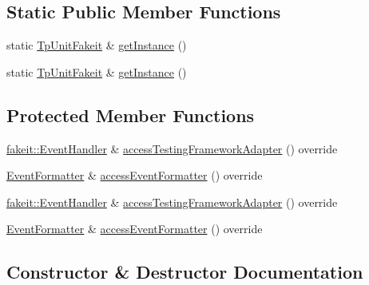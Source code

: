 \subsection*{Static Public Member Functions}
\begin{DoxyCompactItemize}
\item 
static \mbox{\hyperlink{classfakeit_1_1TpUnitFakeit}{Tp\+Unit\+Fakeit}} \& \mbox{\hyperlink{classfakeit_1_1TpUnitFakeit_ae92881b2c1b37f04ed19bc3a95e4514f}{get\+Instance}} ()
\item 
static \mbox{\hyperlink{classfakeit_1_1TpUnitFakeit}{Tp\+Unit\+Fakeit}} \& \mbox{\hyperlink{classfakeit_1_1TpUnitFakeit_ae92881b2c1b37f04ed19bc3a95e4514f}{get\+Instance}} ()
\end{DoxyCompactItemize}
\subsection*{Protected Member Functions}
\begin{DoxyCompactItemize}
\item 
\mbox{\hyperlink{structfakeit_1_1EventHandler}{fakeit\+::\+Event\+Handler}} \& \mbox{\hyperlink{classfakeit_1_1TpUnitFakeit_a38a83890a6d647457022347cd2a42aaf}{access\+Testing\+Framework\+Adapter}} () override
\item 
\mbox{\hyperlink{structfakeit_1_1EventFormatter}{Event\+Formatter}} \& \mbox{\hyperlink{classfakeit_1_1TpUnitFakeit_ae0f3713842b30e36ee1b0ce03a070b59}{access\+Event\+Formatter}} () override
\item 
\mbox{\hyperlink{structfakeit_1_1EventHandler}{fakeit\+::\+Event\+Handler}} \& \mbox{\hyperlink{classfakeit_1_1TpUnitFakeit_a38a83890a6d647457022347cd2a42aaf}{access\+Testing\+Framework\+Adapter}} () override
\item 
\mbox{\hyperlink{structfakeit_1_1EventFormatter}{Event\+Formatter}} \& \mbox{\hyperlink{classfakeit_1_1TpUnitFakeit_ae0f3713842b30e36ee1b0ce03a070b59}{access\+Event\+Formatter}} () override
\end{DoxyCompactItemize}


\subsection{Constructor \& Destructor Documentation}
\mbox{\label{classfakeit_1_1TpUnitFakeit_ab46207ba99073817bc69acd834f0be76}} 

